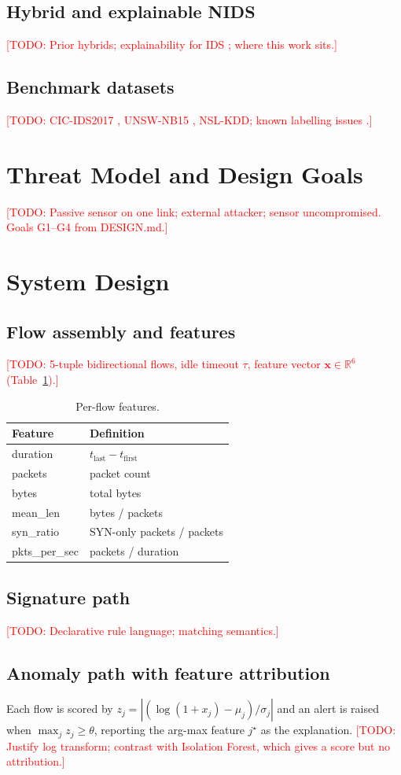 \documentclass[conference]{IEEEtran}
\newcommand{\todo}[1]{\textcolor{red}{[TODO: #1]}}
\begin{document}
\subsection{Hybrid and explainable NIDS}
\todo{Prior hybrids; explainability for IDS \cite{arp2022dos}; where this work sits.}
\subsection{Benchmark datasets}
\todo{CIC-IDS2017 \cite{sharafaldin2018toward}, UNSW-NB15 \cite{moustafa2015unsw}, NSL-KDD; known labelling issues \cite{engelen2021troubleshooting}.}

\section{Threat Model and Design Goals}
\todo{Passive sensor on one link; external attacker; sensor uncompromised. Goals G1--G4 from DESIGN.md.}

\section{System Design}
\subsection{Flow assembly and features}
\todo{5-tuple bidirectional flows, idle timeout $\tau$, feature vector $\mathbf{x} \in \mathbb{R}^6$ (Table~\ref{tab:features}).}
\begin{table}[t]
\centering\caption{Per-flow features.}\label{tab:features}
\begin{tabular}{ll}\toprule
Feature & Definition \\\midrule
duration & $t_{\text{last}} - t_{\text{first}}$ \\
packets & packet count \\
bytes & total bytes \\
mean\_len & bytes / packets \\
syn\_ratio & SYN-only packets / packets \\
pkts\_per\_sec & packets / duration \\\bottomrule
\end{tabular}
\end{table}
\subsection{Signature path}
\todo{Declarative rule language; matching semantics.}
\subsection{Anomaly path with feature attribution}
Each flow is scored by $z_j = |(\log(1+x_j) - \mu_j)/\sigma_j|$ and an alert is raised when $\max_j z_j \ge \theta$, reporting the arg-max feature $j^\star$ as the explanation. \todo{Justify log transform; contrast with Isolation Forest, which gives a score but no attribution.}
\end{document}
